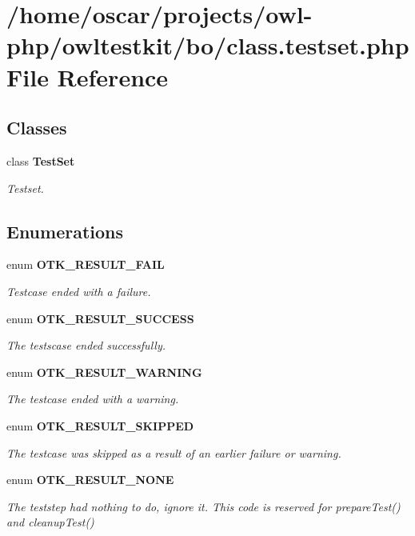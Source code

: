 \section{/home/oscar/projects/owl-\/php/owltestkit/bo/class.testset.php File Reference}
\label{class_8testset_8php}
\subsection*{Classes}
\begin{DoxyCompactItemize}
\item 
class {\bf TestSet}
\begin{DoxyCompactList}\small\item\em Testset. \end{DoxyCompactList}\end{DoxyCompactItemize}
\subsection*{Enumerations}
\begin{DoxyCompactItemize}
\item 
enum {\bf OTK\_\-RESULT\_\-FAIL} 
\begin{DoxyCompactList}\small\item\em Testcase ended with a failure. \end{DoxyCompactList}\item 
enum {\bf OTK\_\-RESULT\_\-SUCCESS} 
\begin{DoxyCompactList}\small\item\em The testscase ended successfully. \end{DoxyCompactList}\item 
enum {\bf OTK\_\-RESULT\_\-WARNING} 
\begin{DoxyCompactList}\small\item\em The testcase ended with a warning. \end{DoxyCompactList}\item 
enum {\bf OTK\_\-RESULT\_\-SKIPPED} 
\begin{DoxyCompactList}\small\item\em The testcase was skipped as a result of an earlier failure or warning. \end{DoxyCompactList}\item 
enum {\bf OTK\_\-RESULT\_\-NONE} 
\begin{DoxyCompactList}\small\item\em The teststep had nothing to do, ignore it. This code is reserved for prepareTest() and cleanupTest() \end{DoxyCompactList}\end{DoxyCompactItemize}


